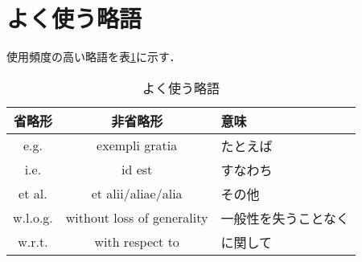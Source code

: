 \documentclass[a4paper,10pt,twocolumn,dvipdfmx]{jsarticle}
\theoremstyle{definition}
\begin{document}
\clearpage
\appendix
\section{よく使う略語}\label{sec:abrv}
使用頻度の高い略語を表\ref{tab:abbrv}に示す．
\begin{table}[htb]
 \small
 \centering
 \caption{よく使う略語}
 \begin{tabular}{ccl}
  省略形 & 非省略形 & 意味\\\hline
  e.g. & exempli gratia & たとえば\\
  i.e. & id est & すなわち\\
  et al. & et alii/aliae/alia & その他\\
  w.l.o.g. & {\footnotesize without loss of generality} & {\footnotesize 一般性を失うことなく}\\
  w.r.t. & with respect to & に関して
 \end{tabular}
 \label{tab:abbrv}
\end{table}
\end{document}
